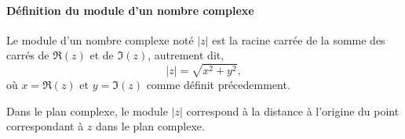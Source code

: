 %

\paragraph{Définition du module d'un nombre complexe}
Le module d'un nombre complexe noté $|z|$ est la 
racine carrée de la somme des carrés de $\Re(z)$ et de $\Im(z)$, 
autrement dit, 
$$
|z|=\sqrt{x^2+y^2},
$$
où $x=\Re(z)$ et $y=\Im(z)$ comme définit précedemment.

Dans le plan complexe, le module $|z|$ correspond à la distance à l'origine du 
point correspondant à $z$ dans le plan complexe.


